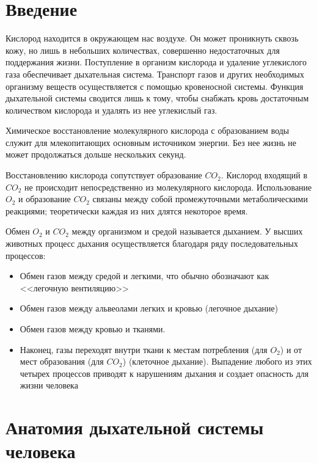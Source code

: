 \documentclass[a4paper,14pt]{extreport}
\begin{document}

\addtocounter{page}{1}

\tableofcontents

\chapter*{Введение}
Кислород  находится  в  окружающем  нас  воздухе. Он  может проникнуть  сквозь  кожу,  но  лишь  в  небольших количествах,  совершенно  недостаточных  для  поддержания  жизни. Поступление  в  организм  кислорода  и  удаление  углекислого  газа  обеспечивает  дыхательная  система.  Транспорт  газов  и  других  необходимых  организму    веществ  осуществляется  с  помощью  кровеносной  системы.  Функция  дыхательной системы  сводится  лишь  к  тому,  чтобы  снабжать  кровь  достаточным  количеством  кислорода и  удалять  из  нее  углекислый  газ. 

Химическое восстановление молекулярного кислорода с образованием воды служит для млекопитающих основным источником  энергии. Без нее жизнь не может продолжаться дольше нескольких секунд. 

Восстановлению кислорода сопутствует образование $CO_2$. Кислород входящий в $CO_2$ не происходит непосредственно из молекулярного кислорода. Использование $O_2$  и образование $CO_2$  связаны  между собой промежуточными метаболическими реакциями; теоретически каждая из них длятся некоторое время. 

Обмен  $O_2$  и $CO_2$  между организмом и средой называется дыханием. У высших животных процесс дыхания осуществляется благодаря ряду последовательных процессов:

\begin{itemize}
    \item Обмен газов между средой и легкими, что обычно обозначают как <<легочную вентиляцию>>
    \item Обмен газов между альвеолами легких и кровью  (легочное дыхание)
    \item Обмен газов между кровью и тканями.
    \item Наконец, газы переходят внутри ткани к местам потребления (для $O_2$) и от мест образования (для $CO_2$) (клеточное дыхание).  Выпадение любого из этих четырех процессов приводят к нарушениям дыхания и создает опасность для жизни человека
\end{itemize}

\chapter{Анатомия дыхательной системы человека}
\end{document}
